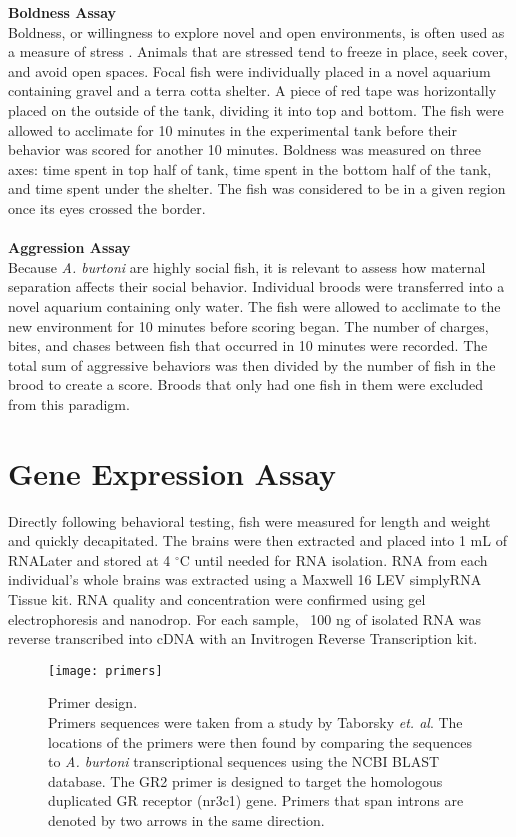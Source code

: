 \documentclass[12pt,twoside]{reedthesis}
\begin{document}
\noindent\textbf{Boldness Assay}\\
Boldness, or willingness to explore novel and open environments, is often used
as a measure of stress \citep{bannier_early_2017, francis_nongenomic_1999}. Animals that are stressed tend to freeze in place, seek
cover, and avoid open spaces. Focal fish were individually placed in a novel aquarium
containing gravel and a terra cotta shelter. A piece of red tape was
horizontally placed on the outside of the tank, dividing it into top and bottom.
The fish were allowed to acclimate for
10 minutes in the experimental tank before their behavior was scored for another 10 minutes. Boldness was
measured on three axes: time spent in top half of tank, time spent in the
bottom half of the tank, and time spent under the shelter. The fish was
considered to be in a given region once its eyes crossed the border.\\
\\
\noindent\textbf{Aggression Assay}\\
Because \textit{A. burtoni} are highly social fish, it is relevant to assess how
maternal separation affects their social behavior. Individual broods were
transferred into a novel aquarium containing only water. The fish were allowed
to acclimate to the new environment for 10 minutes before scoring began. The
number of charges, bites, and chases between fish that occurred in 10 minutes
were recorded. The total sum of aggressive behaviors was then divided by the number of fish in the brood to create a score. Broods that only had one fish in them were excluded from this paradigm.  


\section{Gene Expression Assay}
Directly following behavioral testing, fish were measured for length and weight
and quickly decapitated. The brains were then extracted and placed into 1 mL of
RNALater and
stored at 4 $^\circ$C until needed for RNA isolation. RNA from each individual's
whole brains was extracted
using a Maxwell 16 LEV simplyRNA Tissue kit. RNA quality and concentration were confirmed using gel
electrophoresis and nanodrop. For each sample, ~100 ng of isolated RNA was
reverse transcribed into cDNA with an Invitrogen Reverse Transcription kit.

\begin{figure}[htbp] 
\begin{centering} 
\texttt{[image: primers]}
\caption[Primer design]{\footnotesize{Primer design. \\ Primers sequences were taken
  from a study by Taborsky \textit{et. al}. The locations of the primers were then found by
  comparing the sequences to \textit{A. burtoni} transcriptional sequences using
the NCBI BLAST database. The GR2 primer is designed to target the homologous
duplicated GR receptor (nr3c1) gene. Primers that span introns are denoted by two arrows in
the same direction.}} 
\label{subd}
\end{centering} 
\end{figure}
\end{document}
